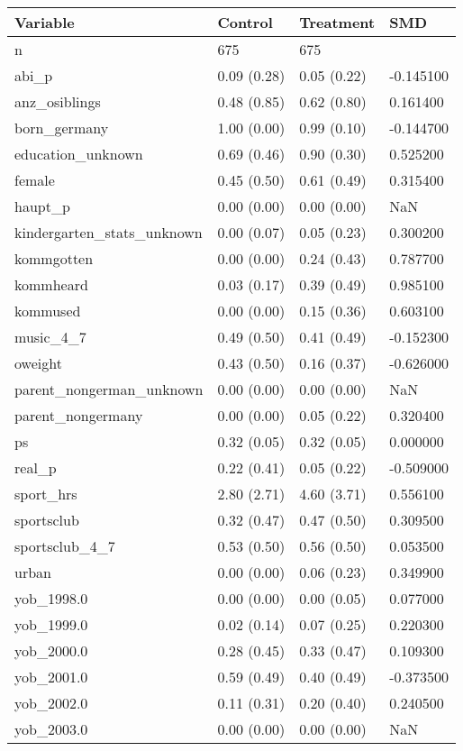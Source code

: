 \begin{tabular}{llll}
\toprule
Variable & Control & Treatment & SMD \\
\midrule
n & 675 & 675 &  \\
abi\_p & 0.09 (0.28) & 0.05 (0.22) & -0.145100 \\
anz\_osiblings & 0.48 (0.85) & 0.62 (0.80) & 0.161400 \\
born\_germany & 1.00 (0.00) & 0.99 (0.10) & -0.144700 \\
education\_unknown & 0.69 (0.46) & 0.90 (0.30) & 0.525200 \\
female & 0.45 (0.50) & 0.61 (0.49) & 0.315400 \\
haupt\_p & 0.00 (0.00) & 0.00 (0.00) & NaN \\
kindergarten\_stats\_unknown & 0.00 (0.07) & 0.05 (0.23) & 0.300200 \\
kommgotten & 0.00 (0.00) & 0.24 (0.43) & 0.787700 \\
kommheard & 0.03 (0.17) & 0.39 (0.49) & 0.985100 \\
kommused & 0.00 (0.00) & 0.15 (0.36) & 0.603100 \\
music\_4\_7 & 0.49 (0.50) & 0.41 (0.49) & -0.152300 \\
oweight & 0.43 (0.50) & 0.16 (0.37) & -0.626000 \\
parent\_nongerman\_unknown & 0.00 (0.00) & 0.00 (0.00) & NaN \\
parent\_nongermany & 0.00 (0.00) & 0.05 (0.22) & 0.320400 \\
ps & 0.32 (0.05) & 0.32 (0.05) & 0.000000 \\
real\_p & 0.22 (0.41) & 0.05 (0.22) & -0.509000 \\
sport\_hrs & 2.80 (2.71) & 4.60 (3.71) & 0.556100 \\
sportsclub & 0.32 (0.47) & 0.47 (0.50) & 0.309500 \\
sportsclub\_4\_7 & 0.53 (0.50) & 0.56 (0.50) & 0.053500 \\
urban & 0.00 (0.00) & 0.06 (0.23) & 0.349900 \\
yob\_1998.0 & 0.00 (0.00) & 0.00 (0.05) & 0.077000 \\
yob\_1999.0 & 0.02 (0.14) & 0.07 (0.25) & 0.220300 \\
yob\_2000.0 & 0.28 (0.45) & 0.33 (0.47) & 0.109300 \\
yob\_2001.0 & 0.59 (0.49) & 0.40 (0.49) & -0.373500 \\
yob\_2002.0 & 0.11 (0.31) & 0.20 (0.40) & 0.240500 \\
yob\_2003.0 & 0.00 (0.00) & 0.00 (0.00) & NaN \\
\bottomrule
\end{tabular}
